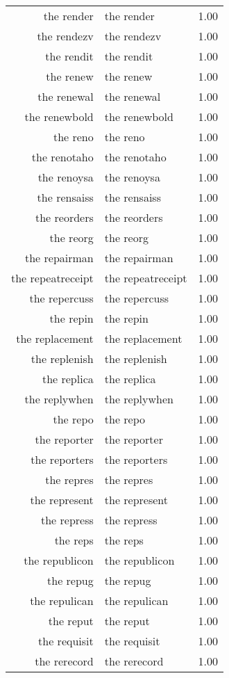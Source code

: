 \begin{table}[ht]
\begin{tabular}{rlr}
  the render & the render & 1.00 \\ 
  the rendezv & the rendezv & 1.00 \\ 
  the rendit & the rendit & 1.00 \\ 
  the renew & the renew & 1.00 \\ 
  the renewal & the renewal & 1.00 \\ 
  the renewbold & the renewbold & 1.00 \\ 
  the reno & the reno & 1.00 \\ 
  the renotaho & the renotaho & 1.00 \\ 
  the renoysa & the renoysa & 1.00 \\ 
  the rensaiss & the rensaiss & 1.00 \\ 
  the reorders & the reorders & 1.00 \\ 
  the reorg & the reorg & 1.00 \\ 
  the repairman & the repairman & 1.00 \\ 
  the repeatreceipt & the repeatreceipt & 1.00 \\ 
  the repercuss & the repercuss & 1.00 \\ 
  the repin & the repin & 1.00 \\ 
  the replacement & the replacement & 1.00 \\ 
  the replenish & the replenish & 1.00 \\ 
  the replica & the replica & 1.00 \\ 
  the replywhen & the replywhen & 1.00 \\ 
  the repo & the repo & 1.00 \\ 
  the reporter & the reporter & 1.00 \\ 
  the reporters & the reporters & 1.00 \\ 
  the repres & the repres & 1.00 \\ 
  the represent & the represent & 1.00 \\ 
  the repress & the repress & 1.00 \\ 
  the reps & the reps & 1.00 \\ 
  the republicon & the republicon & 1.00 \\ 
  the repug & the repug & 1.00 \\ 
  the repulican & the repulican & 1.00 \\ 
  the reput & the reput & 1.00 \\ 
  the requisit & the requisit & 1.00 \\ 
  the rerecord & the rerecord & 1.00 \\ 

\end{tabular}
\end{table}
